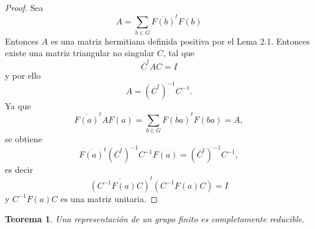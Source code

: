 \documentclass[12pt]{book}
\newtheorem{theorem}{Teorema}[section]
\theoremstyle{definition}
\newcounter{in}
\newcounter{ini}
\begin{document}
\begin{proof}
  Sea
  \begin{equation*}
    A=\sum_{b \in G} \overline{F\left(b\right)}^{t}F\left(b\right)
  \end{equation*}
  Entonces $A$ es una matriz hermitiana definida positiva por el Lema
  2.1. Entonces existe una matriz triangular no singular $C$, tal que
  \begin{equation*}
    \overline{C}^{t}AC= I
  \end{equation*}
  y por ello
  \begin{equation}
    \label{eq:9}
    A=(\overline{C}^{t})^{-1}C^{-1}.
  \end{equation}
  Ya que
  \begin{equation}
    \label{eq:10}
    \overline{F\left(a\right)}^{t}AF\left(a\right)=\sum_{b \in G} \overline{F\left(ba\right)}^{t}F\left(ba\right)=A,
  \end{equation}
  se obtiene
  \begin{equation}
    \label{eq:11}
    \overline{F\left(a\right)}^{t}(\overline{C}^{t})^{-1}C^{-1}F\left(a\right)=(\overline{C}^{t})^{-1}C^{-1},
  \end{equation}
  es decir
  \begin{equation}
    \label{eq:12}
    \overline{(C^{-1}F(a)C)}^{t}(C^{-1}F(a)C)=I
  \end{equation}
  y $C^{-1}F(a)C$ es una matriz unitaria.
\end{proof}
\begin{theorem}
  \label{t2_4}
  Una representación de un grupo finito es
  completamente reducible.
\end{theorem}
\end{document}
